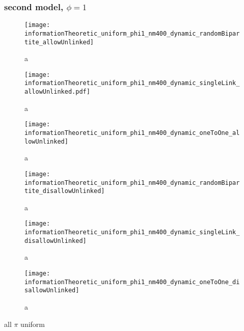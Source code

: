 \subsubsection{second model, $\phi=1$}

\begin{figure}
  \centering
  \texttt{[image: informationTheoretic\_uniform\_phi1\_nm400\_dynamic\_randomBipartite\_allowUnlinked]}
  \caption{a}
  \label{fig:informationTheoretic_uniform_phi1_nm400_dynamic_randomBipartite_allowUnlinked}
\end{figure}

\begin{figure}
  \centering
  \texttt{[image: informationTheoretic\_uniform\_phi1\_nm400\_dynamic\_singleLink\_allowUnlinked.pdf]}
  \caption{a}
  \label{fig:informationTheoretic_uniform_phi1_nm400_dynamic_singleLink_allowUnlinked}
\end{figure}

\begin{figure}
  \centering
  \texttt{[image: informationTheoretic\_uniform\_phi1\_nm400\_dynamic\_oneToOne\_allowUnlinked]}
  \caption{a}
  \label{fig:informationTheoretic_uniform_phi1_nm400_dynamic_oneToOne_allowUnlinked}
\end{figure}

\begin{figure}
  \centering
  \texttt{[image: informationTheoretic\_uniform\_phi1\_nm400\_dynamic\_randomBipartite\_disallowUnlinked]}
  \caption{a}
  \label{fig:informationTheoretic_uniform_phi1_nm400_dynamic_randomBipartite_disallowUnlinked}
\end{figure}

\begin{figure}
  \centering
  \texttt{[image: informationTheoretic\_uniform\_phi1\_nm400\_dynamic\_singleLink\_disallowUnlinked]}
  \caption{a}
  \label{fig:informationTheoretic_uniform_phi1_nm400_dynamic_singleLink_disallowUnlinked}
\end{figure}

\begin{figure}
  \centering
  \texttt{[image: informationTheoretic\_uniform\_phi1\_nm400\_dynamic\_oneToOne\_disallowUnlinked]}
  \caption{a}
  \label{fig:informationTheoretic_uniform_phi1_nm400_dynamic_oneToOne_disallowUnlinked}
\end{figure}

all $\pi$ uniform

